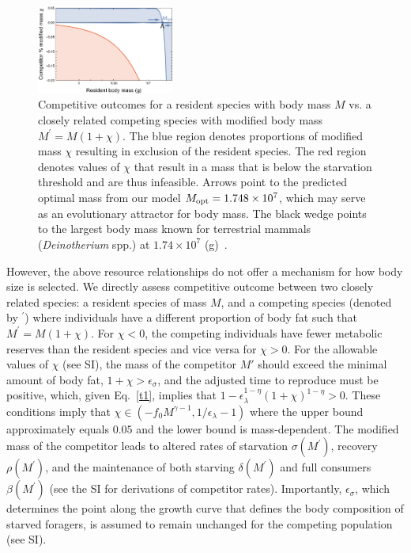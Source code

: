 \documentclass[twocolumn,preprintnumbers,amsmath,amssymb,superscriptaddress]{revtex4}
\begin{document}
\begin{bibunit}[unsrt]
  \begin{figure}
  \centering
  \includegraphics[width=0.4\textwidth]{fig_Invasion-eps-converted-to.pdf}
  \caption{\small{Competitive outcomes for a resident species with body mass
      $M$ vs. a closely related competing species with modified body mass
      $M^\prime=M(1+\chi)$.  The blue region denotes proportions of modified
      mass $\chi$ resulting in exclusion of the resident species.  The red
      region denotes values of $\chi$ that result in a mass that is below the
      starvation threshold and are thus infeasible.  Arrows point to the
      predicted optimal mass from our model $M_{\rm opt}=1.748\times 10^7$,
      which may serve as an evolutionary attractor for body mass.  The black
      wedge points to the largest body mass known for terrestrial mammals
      (\emph{Deinotherium} spp.) at $1.74\times10^7$
      (g)~\citep{Smith:2010p3442}.}\label{fig:invasion}}
  \end{figure}

   


  However, the above resource relationships do not offer a mechanism for how
  body size is selected.  We directly assess competitive outcome between two
  closely related species: a resident species of mass $M$, and a competing
  species (denoted by $^\prime$) where individuals have a different proportion
  of body fat such that $M^\prime=M(1+\chi)$.  For $\chi < 0$, the competing
  individuals have fewer metabolic reserves than the resident species and vice
  versa for $\chi>0$.  For the allowable values of $\chi$ (see SI), the mass of
  the competitor $M'$ should exceed the minimal amount of body fat,
  $1+\chi>\epsilon_{\sigma}$, and the adjusted time to reproduce must be
  positive, which, given Eq.~\ref{t1}, implies that
  $1-\epsilon_{\lambda}^{1-\eta}\left(1+\chi\right)^{1-\eta}>0$.  These
  conditions imply that $\chi\in(-f_0M^{\gamma-1},1/\epsilon_{\lambda}-1)$
  where the upper bound approximately equals $0.05$ and the lower bound is
  mass-dependent.  The modified mass of the competitor leads to altered rates
  of starvation $\sigma(M^\prime)$, recovery $\rho(M^\prime)$, and the
  maintenance of both starving $\delta(M^\prime)$ and full consumers
  $\beta(M^\prime)$ (see the SI for derivations of competitor rates).
  Importantly, $\epsilon_\sigma$, which determines the point along the growth
  curve that defines the body composition of starved foragers, is assumed to
  remain unchanged for the competing population (see SI).


\end{bibunit}
\end{document}
